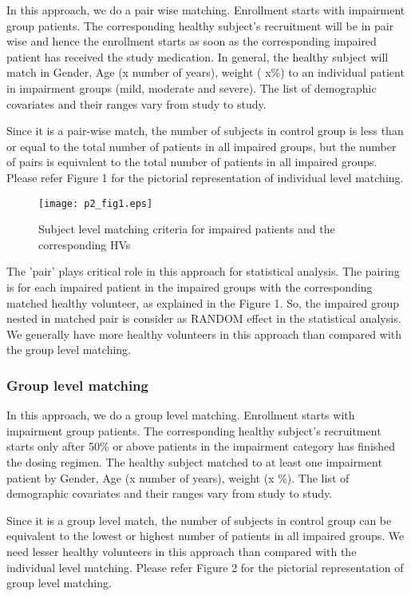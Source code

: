 \documentclass[final]{statistica}
\begin{document}
In this approach, we do a pair wise matching. Enrollment starts with impairment group patients. The corresponding healthy subject's recruitment will be in pair wise and hence the enrollment starts as soon as the corresponding impaired patient has received the study medication. In general, the healthy subject will match in Gender, Age (x number of years), weight ( x\%) to an individual patient in impairment groups (mild, moderate and severe). The list of demographic covariates and their ranges vary from study to study. 
\vspace{3mm}
\par
Since it is a pair-wise match, the number of subjects in control group is less than or equal to the total number of patients in all impaired groups, but the number of pairs is equivalent to the total number of patients in all impaired groups. Please refer Figure 1 for the pictorial representation of individual level matching.

\FloatBarrier
\begin{figure}[h]
	\centering
	\caption{Subject level matching criteria for impaired patients and the corresponding HVs}\label{p2_fig1}	
	\texttt{[image: p2\_fig1.eps]}\\
\end{figure}

The 'pair' plays critical role in this approach for statistical analysis. The pairing is for each impaired patient in the impaired groups with the corresponding matched healthy volunteer, as explained in the Figure 1. So, the impaired group nested in matched pair is consider as RANDOM effect in the statistical analysis. We generally have more healthy volunteers in this approach than compared with the group level matching.

\subsubsection{Group level matching}

In this approach, we do a group level matching. Enrollment starts with impairment group patients. The corresponding healthy subject's recruitment starts only after 50\% or above patients in the impairment category has finished the dosing regimen. The healthy subject matched to at least one impairment patient by Gender, Age (x number of years), weight (x \%). The list of demographic covariates and their ranges vary from study to study.
\vspace{3mm}
\par
Since it is a group level match, the number of subjects in control group can be equivalent to the lowest or highest number of patients in all impaired groups. We need lesser healthy volunteers in this approach than compared with the individual level matching. Please refer Figure 2 for the pictorial representation of group level matching.
\end{document}
